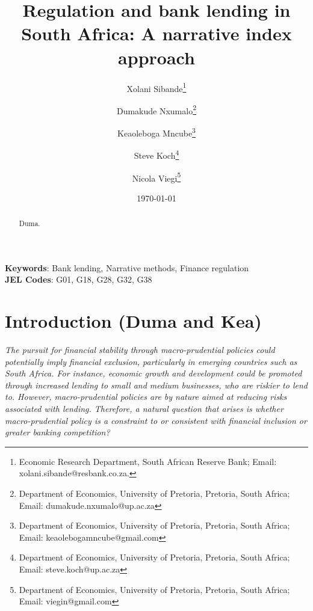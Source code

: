\documentclass[
  letterpaper,
  DIV=11,
  numbers=noendperiod]{scrartcl}
\author{}
\date{}
\begin{document}
\title{Regulation and bank lending in South Africa: A narrative index approach}





\author {Xolani Sibande\footnote{Economic Research Department, South African Reserve Bank; Email: xolani.sibande@resbank.co.za.} \and
Dumakude Nxumalo\footnote{Department of Economics, University of Pretoria, Pretoria, South Africa; Email: dumakude.nxumalo@up.ac.za} \and
Keaoleboga Mncube\footnote{Department of Economics, University of Pretoria, Pretoria, South Africa; Email: keaolebogamncube@gmail.com} \and
Steve Koch\footnote{Department of Economics, University of Pretoria, Pretoria, South Africa; Email: steve.koch@up.ac.za} \and
Nicola Viegi\footnote{Department of Economics, University of Pretoria, Pretoria, South Africa; Email: viegin@gmail.com}}


\date{\today}
\maketitle

\begin{abstract}
Duma.

\end{abstract}

\noindent\textbf{Keywords}: Bank lending, Narrative methods, Finance regulation\\
\textbf{JEL Codes}: G01, G18, G28, G32, G38
\newpage

\ifdefined\Shaded\renewenvironment{Shaded}{\begin{tcolorbox}[interior hidden, enhanced, borderline west={3pt}{0pt}{shadecolor}, frame hidden, breakable, boxrule=0pt, sharp corners]}{\end{tcolorbox}}\fi

\hypertarget{introduction-duma-and-kea}{%
\section{Introduction (Duma and Kea)}\label{introduction-duma-and-kea}}

\textit{The pursuit for financial stability through macro-prudential policies could potentially imply financial exclusion, particularly in emerging countries such as South Africa. For instance, economic growth and development could be promoted through increased lending to small and medium businesses, who are riskier to lend to. However, macro-prudential policies are by nature aimed at reducing risks associated with lending. Therefore, a natural question that arises is whether macro-prudential policy is a constraint to or consistent with financial inclusion or greater banking competition?}
\end{document}
